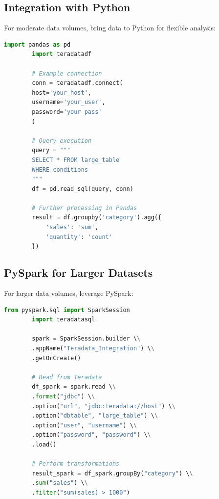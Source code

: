 \documentclass{article}
\begin{document}
	\subsection{Integration with Python}
	
	For moderate data volumes, bring data to Python for flexible analysis:
	
	\begin{lstlisting}[language=Python, caption=Extracting Data to Pandas]
		import pandas as pd
		import teradatadf
		
		# Example connection
		conn = teradatadf.connect(
		host='your_host',
		username='your_user',
		password='your_pass'
		)
		
		# Query execution
		query = """
		SELECT * FROM large_table
		WHERE conditions
		"""
		df = pd.read_sql(query, conn)
		
		# Further processing in Pandas
		result = df.groupby('category').agg({
			'sales': 'sum',
			'quantity': 'count'
		})
	\end{lstlisting}
	
	\subsection{PySpark for Larger Datasets}
	
	For larger data volumes, leverage PySpark:
	
	\begin{lstlisting}[language=Python, caption=PySpark Integration]
		from pyspark.sql import SparkSession
		import teradatasql
		
		spark = SparkSession.builder \\
		.appName("Teradata_Integration") \\
		.getOrCreate()
		
		# Read from Teradata
		df_spark = spark.read \\
		.format("jdbc") \\
		.option("url", "jdbc:teradata://host") \\
		.option("dbtable", "large_table") \\
		.option("user", "username") \\
		.option("password", "password") \\
		.load()
		
		# Perform transformations
		result_spark = df_spark.groupBy("category") \\
		.sum("sales") \\
		.filter("sum(sales) > 1000")
	\end{lstlisting}
	
\end{document}
